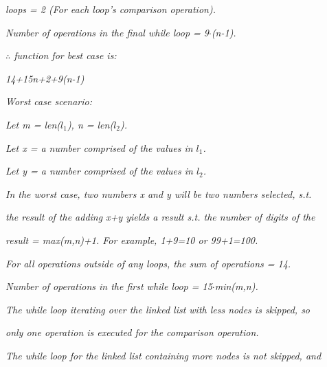 \documentclass{article}
\begin{document}
\textit{loops = 2 (For each loop's comparison operation).}

\vspace{0.25cm} 

\textit{Number of operations in the final while loop = 9$\cdot$(n-1).}

\vspace{0.25cm} 

\textit{$\therefore$ function for best case is: }

\begin{center}
	\textit{14+15n+2+9(n-1)}
\end{center}

\vspace{0.5cm} 

\textit{Worst case scenario:}

\textit{Let m = len($l_1$), n = len($l_2$).}

\vspace{0.25cm} 

\textit{Let x = a number comprised of the values in $l_1$.}

\textit{Let y = a number comprised of the values in $l_2$.}

\vspace{0.25cm} 

\textit{In the worst case, two numbers x and y will be two numbers selected, s.t.}

\textit{the result of the adding x+y yields a result s.t. the number of digits of the}

\textit{result = max(m,n)+1. For example, 1+9=10 or 99+1=100.}

\vspace{0.25cm} 

\textit{For all operations outside of any loops, the sum of operations = 14.}

\vspace{0.25cm} 

\textit{Number of operations in the first while loop = 15$\cdot$min(m,n).}

\vspace{0.25cm} 

\textit{The while loop iterating over the linked list with less nodes is skipped, so}

\textit{only one operation is executed for the comparison operation.}

\vspace{0.25cm} 

\textit{The while loop for the linked list containing more nodes is not skipped, and}
\end{document}
